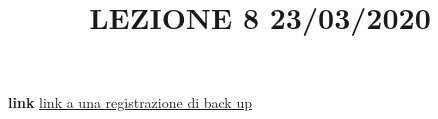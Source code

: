\title{LEZIONE 8 23/03/2020}\newline
\textbf{link} \href{https://onedrive.live.com/?authkey=%21AATVJK3srNwxGzs&id=EE092FF4FF7B5B0E%212158&cid=EE092FF4FF7B5B0E}{link a una registrazione di back up}
\section{}